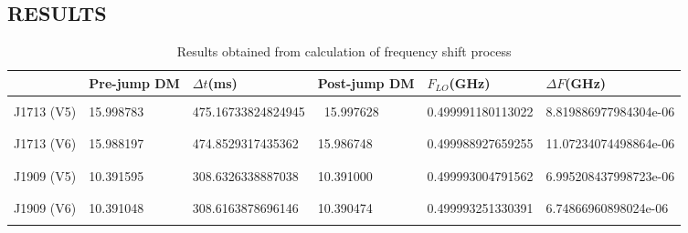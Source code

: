 \documentclass{article}
\begin{document}
\subsection{RESULTS}
\begin{table}[htbp]
 \caption{Results obtained from calculation of frequency shift process}
  \centering
  \begin{tabular}{llllll}
    \toprule
    \cmidrule(r){1-4}
        & Pre-jump DM    &   $\Delta t$(ms) & Post-jump DM & $F_{LO}$(GHz)& $\Delta F$(GHz)\\
    \midrule\\ J1713 (V5)    & 15.998783   &  475.16733824824945  & \  15.997628 & 0.499991180113022 & 8.819886977984304e-06 \\\\
  \hline\\ J1713 (V6)   & 15.988197  & 474.8529317435362  &  15.986748 & 0.499988927659255 & 11.07234074498864e-06 \\\\
  \hline\\ J1909 (V5)   & 10.391595  & 308.6326338887038  &  10.391000 & 0.499993004791562 & 6.995208437998723e-06 \\\\
  \hline\\ J1909 (V6)   & 10.391048  & 308.6163878696146  &  10.390474 & 0.499993251330391 & 6.74866960898024e-06 \\\\
 \cmidrule(r){1-6}
  \end{tabular}
  \label{tab:table}
\end{table}
\newpage
\end{document}
